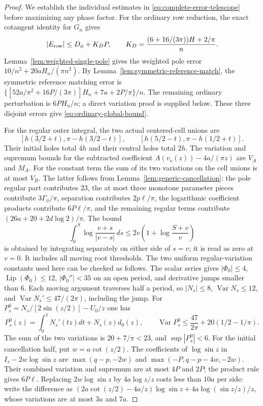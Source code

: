 \begin{proof}
We establish the individual estimates in
\eqref{eq:complete-error-telescope} before maximizing any phase factor.
For the ordinary row reduction, the exact cotangent identity for $G_n$
gives
\begin{equation}\label{eq:ordinary-global-bound}
 |E_{\rm row}|\leq D_\phi+K_DP,
 \qquad K_D=\frac{(6+16/(3\pi))H+2/\pi}{n}.
\end{equation}
Lemma~\ref{lem:weighted-single-pole} gives the weighted pole error
$10/n^2+20aH_n/(\pi n^2)$. By
Lemma~\ref{lem:symmetric-reference-match}, the symmetric reference
matching error is
$\{[52a/\pi^2+16P/(3\pi)]H_n+7a+2P/\pi\}/n$.
The remaining ordinary perturbation is $6PH_n/n$; a direct variation
proof is supplied below. These three disjoint errors give
\eqref{eq:ordinary-global-bound}.

For the regular outer integral, the two actual centered-cell unions are
\[
 [h(3/2+t),\pi-h(3/2-t)],\qquad
 [h(5/2-t),\pi-h(1/2+t)].
\]
Their initial holes total $4h$ and their central holes total $2h$.
The variation and supremum bounds for the subtracted coefficient
$A(v_s(z))-4a/(\pi z)$ are $V_A$ and $M_A$. For the constant term
the sum of its two variations on the cell unions is at most $V_B$.
The latter follows from Lemma~\ref{lem:generic-cancellation}: the pole
regular part contributes $23$, the at most three monotone parameter
pieces contribute $3\Gamma_\phi/\pi$, separation contributes
$2p\ell/\pi$, the logarithmic coefficient products contribute
$6P\ell/\pi$, and the remaining regular terms contribute
$(26a+20+2d\log2)/\pi$. The bound
\[
 \int_0^S\log\frac{v+s}{|v-s|}\,ds
       \leq2v\left(1+\log\frac{S+v}{v}\right)
\]
is obtained by integrating separately on either side of $s=v$;
it is read as zero at $v=0$. It includes all moving root thresholds.
The two uniform regular-variation constants used here can be checked
as follows. The scalar series gives $|\Phi_0|\leq4$,
$\operatorname{Lip}(\Phi_0)\leq12$, $|\Phi_0''|<35$ on an open
period, and derivative jumps smaller than $6$. Each moving argument
traverses half a period, so $|N_s|\leq8$,
$\operatorname{Var}N_s\leq12$, and
$\operatorname{Var}N_s'\leq47/(2\pi)$, including the jump.
For $P_s^0=N_s/[2\sin(z/2)]-U_0/z$ one has
\[
 P_s^0(z)=\int_0^1N_s'(tz)dt+N_s(z)d_0(z),\qquad
 \operatorname{Var}P_s^0\leq\frac{47}{2\pi}+20(1/2-1/\pi).
\]
The sum of the two variations is $20+7/\pi<23$, and
$\sup|P_s^0|<6$. For the initial cancellation half, put
$w=a\cot(z/2)$. The coefficients of $\log\sin z$ in
$I_s-2w\log\sin z$ are
$\max(q-p,-2w)$ and $\max(-P,q-p-4w,-2w)$.
Their combined variation and supremum are at most $4P$ and $2P$;
the product rule gives $6P\ell$. Replacing $2w\log\sin z$ by
$4a\log z/z$ costs less than $10a$ per side: write the difference as
$(2a\cot(z/2)-4a/z)\log\sin z+4a\log(\sin z/z)/z$,
whose variations are at most $3a$ and $7a$.


\end{proof}
